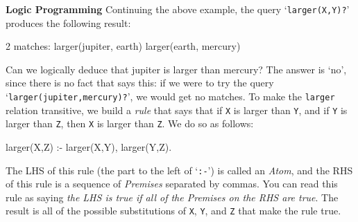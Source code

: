 \begin{minipage}[t]{\sw}
\slidenumber
\LARGE
{\bf Logic Programming}\exx
Continuing the above example,
the query `\verb'larger(X,Y)?''
produces the following result:
{\Large
\begin{qv}
2 matches:
larger(jupiter, earth)
larger(earth, mercury)
\end{qv}
}
Can we logically deduce that jupiter is larger than mercury?
The answer is `no', since there is no fact that says this:
if we were to try the query `\verb'larger(jupiter,mercury)?'',
we would get no matches.\exx
To make the \verb'larger' relation transitive,
we build a {\em rule} that says that
if \verb'X' is larger than \verb'Y',
and if \verb'Y' is larger than \verb'Z',
then \verb'X' is larger than \verb'Z'.
We do so as follows:
{\Large
\begin{qv}
larger(X,Z) :- larger(X,Y), larger(Y,Z).
\end{qv}
}
The LHS of this rule (the part to the left of `\verb':-'')
is called an {\em Atom},
and the RHS of this rule is a sequence of {\em Premises}
separated by commas.
You can read this rule as saying
{\em the LHS is true if all of the Premises on the RHS are true}.
The result is all of the possible substitutions
of \verb'X', \verb'Y', and \verb'Z'
that make the rule true.
\end{minipage}
